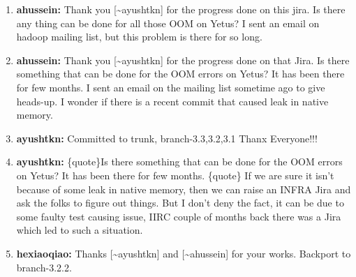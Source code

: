 \documentclass{report}%
\begin{document}
\begin{enumerate}
\newline%
\newline%
\newline%
%
\item%
\textbf{ahussein: }Thank you {[}\textasciitilde{}ayushtkn{]} for the progress done on this jira.\newline%
\newline%
Is there any thing can be done for all those OOM on Yetus?\newline%
\newline%
I sent an email on hadoop mailing list, but this problem is there for so long.\newline%
\newline%
%
\item%
\textbf{ahussein: }Thank you {[}\textasciitilde{}ayushtkn{]} for the progress done on that Jira.\newline%
\newline%
Is there something that can be done for the OOM errors on Yetus? It has been there for few months.\newline%
\newline%
I sent an email on the mailing list sometime ago to give heads{-}up.\newline%
\newline%
I wonder if there is a recent commit that caused leak in native memory.%
\item%
\textbf{ayushtkn: }Committed to trunk, branch{-}3.3,3.2,3.1\newline%
\newline%
\newline%
\newline%
Thanx Everyone!!!%
\item%
\textbf{ayushtkn: }\{quote\}Is there something that can be done for the OOM errors on Yetus? It has been there for few months.\newline%
\newline%
\{quote\}\newline%
\newline%
If we are sure it isn't because of some leak in native memory, then we can raise an INFRA Jira and ask the folks to figure out things.\newline%
\newline%
\newline%
\newline%
But I don't deny the fact, it can be due to some faulty test causing issue, IIRC couple of months back there was a Jira which led to such a situation.%
\item%
\textbf{hexiaoqiao: }Thanks {[}\textasciitilde{}ayushtkn{]} and {[}\textasciitilde{}ahussein{]} for your works. Backport to branch{-}3.2.2.%
\end{enumerate}

%
\end{document}
